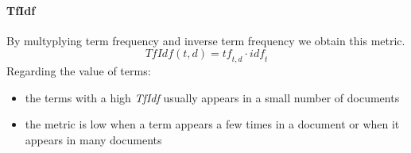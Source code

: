 \paragraph{TfIdf}
By multyplying term frequency and inverse term frequency we obtain this metric.
$$TfIdf(t, d) = \mathit{tf}_{t,d} \cdot \mathit{idf}_t$$
Regarding the value of terms:
\begin{itemize}
    \item the terms with a high \emph{TfIdf} usually appears in a small number of documents
    \item the metric is low when a term appears a few times in a document or when it appears in 
    many documents
\end{itemize}